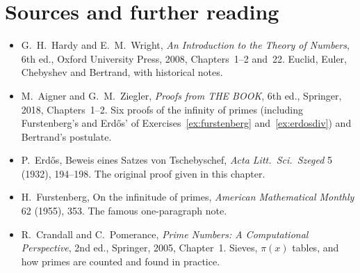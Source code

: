 \section*{Sources and further reading}

\begin{itemize}
\item G.~H.~Hardy and E.~M.~Wright, \emph{An Introduction to the Theory of Numbers}, 6th ed., Oxford University Press, 2008, Chapters~1--2 and~22. Euclid, Euler, Chebyshev and Bertrand, with historical notes.
\item M.~Aigner and G.~M.~Ziegler, \emph{Proofs from THE BOOK}, 6th ed., Springer, 2018, Chapters~1--2. Six proofs of the infinity of primes (including Furstenberg's and Erd\H{o}s' of Exercises~\ref{ex:furstenberg} and~\ref{ex:erdosdiv}) and Bertrand's postulate.
\item P.~Erd\H{o}s, Beweis eines Satzes von Tschebyschef, \emph{Acta Litt.\ Sci.\ Szeged} 5 (1932), 194--198. The original proof given in this chapter.
\item H.~Furstenberg, On the infinitude of primes, \emph{American Mathematical Monthly} 62 (1955), 353. The famous one-paragraph note.
\item R.~Crandall and C.~Pomerance, \emph{Prime Numbers: A Computational Perspective}, 2nd ed., Springer, 2005, Chapter~1. Sieves, $\pi(x)$ tables, and how primes are counted and found in practice.
\end{itemize}
